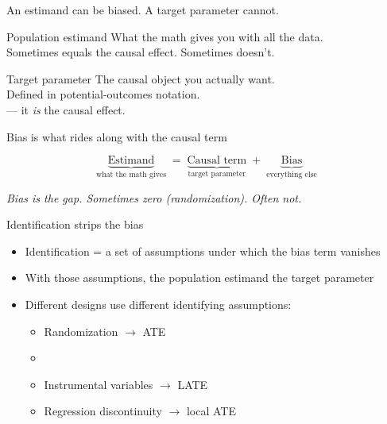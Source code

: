\documentclass[aspectratio=169,11pt]{beamer}
\begin{document}
\begin{frame}{An estimand can be biased. A target parameter cannot.}
\vspace{0.5em}
\begin{block}{Population estimand}
What the math gives you with all the data. \\
Sometimes equals the causal effect. Sometimes doesn't.
\end{block}
\vspace{-0.5em}
\begin{alertblock}{Target parameter}
The causal object you actually want. \\
Defined in potential-outcomes notation. \\
 --- it \textit{is} the causal effect.
\end{alertblock}
\end{frame}

\begin{frame}{Bias is what rides along with the causal term}
\vspace{1.5em}
\begin{center}
\large
\[
\underbrace{\text{Estimand}}_{\text{what the math gives}} \;=\; \underbrace{\text{Causal term}}_{\text{target parameter}} \;+\; \underbrace{\text{Bias}}_{\text{everything else}}
\]
\end{center}
\vspace{1.5em}
\begin{center}
\small\color{warmgray}\itshape
Bias is the gap. Sometimes zero (randomization). Often not.
\end{center}
\end{frame}

\begin{frame}{Identification strips the bias}
\vspace{0.4em}
\begin{itemize}
  \item Identification = a set of assumptions under which the bias term vanishes
  \item With those assumptions, the population estimand  the target parameter
  \item Different designs use different identifying assumptions:
  \begin{itemize}
    \item Randomization $\rightarrow$ ATE
    \item {}
    \item Instrumental variables $\rightarrow$ LATE
    \item Regression discontinuity $\rightarrow$ local ATE
  \end{itemize}
\end{itemize}
\end{frame}
\end{document}
